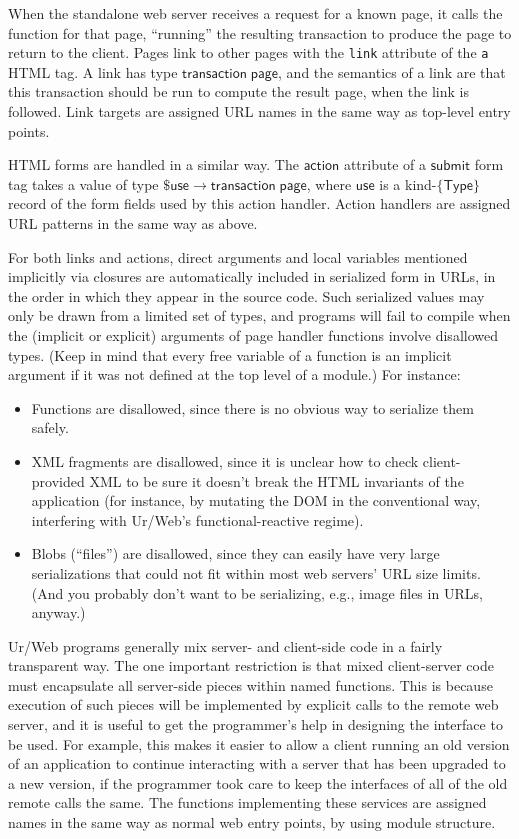 \documentclass{article}
\newcommand{\mt}[1]{\mathsf{#1}}
\begin{document}
When the standalone web server receives a request for a known page, it calls the function for that page, ``running'' the resulting transaction to produce the page to return to the client.  Pages link to other pages with the \texttt{link} attribute of the \texttt{a} HTML tag.  A link has type $\mt{transaction} \; \mt{page}$, and the semantics of a link are that this transaction should be run to compute the result page, when the link is followed.  Link targets are assigned URL names in the same way as top-level entry points.

HTML forms are handled in a similar way.  The $\mt{action}$ attribute of a $\mt{submit}$ form tag takes a value of type $\$\mt{use} \to \mt{transaction} \; \mt{page}$, where $\mt{use}$ is a kind-$\{\mt{Type}\}$ record of the form fields used by this action handler.  Action handlers are assigned URL patterns in the same way as above.

For both links and actions, direct arguments and local variables mentioned implicitly via closures are automatically included in serialized form in URLs, in the order in which they appear in the source code.  Such serialized values may only be drawn from a limited set of types, and programs will fail to compile when the (implicit or explicit) arguments of page handler functions involve disallowed types.  (Keep in mind that every free variable of a function is an implicit argument if it was not defined at the top level of a module.)  For instance:
\begin{itemize}
  \item Functions are disallowed, since there is no obvious way to serialize them safely.
  \item XML fragments are disallowed, since it is unclear how to check client-provided XML to be sure it doesn't break the HTML invariants of the application (for instance, by mutating the DOM in the conventional way, interfering with Ur/Web's functional-reactive regime).
  \item Blobs (``files'') are disallowed, since they can easily have very large serializations that could not fit within most web servers' URL size limits.  (And you probably don't want to be serializing, e.g., image files in URLs, anyway.)
\end{itemize}

Ur/Web programs generally mix server- and client-side code in a fairly transparent way.  The one important restriction is that mixed client-server code must encapsulate all server-side pieces within named functions.  This is because execution of such pieces will be implemented by explicit calls to the remote web server, and it is useful to get the programmer's help in designing the interface to be used.  For example, this makes it easier to allow a client running an old version of an application to continue interacting with a server that has been upgraded to a new version, if the programmer took care to keep the interfaces of all of the old remote calls the same.  The functions implementing these services are assigned names in the same way as normal web entry points, by using module structure.
\end{document}

